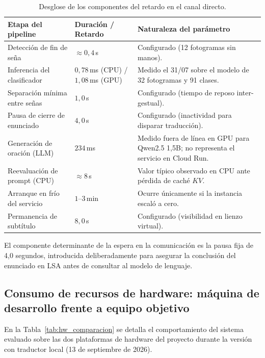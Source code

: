 \begin{table}[H]
    \centering
    \small
    \caption{Desglose de los componentes del retardo en el canal directo.}
    \label{tab:latencias_etapas}
    \begin{tabularx}{\textwidth}{@{}>{\raggedright\arraybackslash}p{} >{\raggedright\arraybackslash}p{} >{\raggedright\arraybackslash}X@{}}
        \toprule
        \textbf{Etapa del pipeline} & \textbf{Duración / Retardo} & \textbf{Naturaleza del parámetro} \\
        \midrule
        Detección de fin de seña & $\approx 0{,}4$\,s & Configurado (12 fotogramas sin manos). \\
        Inferencia del clasificador & $0{,}78$\,ms (CPU) / $1{,}08$\,ms (GPU) & Medido el 31/07 sobre el modelo de 32 fotogramas y 91 clases. \\
        Separación mínima entre señas & $1{,}0$\,s & Configurado (tiempo de reposo inter-gestual). \\
        Pausa de cierre de enunciado & $4{,}0$\,s & Configurado (inactividad para disparar traducción). \\
        Generación de oración (LLM) & $234$\,ms & Medido fuera de línea en GPU para Qwen2.5 1,5B; no representa el servicio en Cloud Run. \\
        Reevaluación de prompt (CPU) & $\approx 8$\,s & Valor típico observado en CPU ante pérdida de caché $KV$. \\
        Arranque en frío del servicio & $1$--$3$\,min & Ocurre únicamente si la instancia escaló a cero. \\
        Permanencia de subtítulo & $8{,}0$\,s & Configurado (visibilidad en lienzo virtual). \\
        \bottomrule
    \end{tabularx}
\end{table}

El componente determinante de la espera en la comunicación es la pausa fija de 4,0 segundos, introducida deliberadamente para asegurar la conclusión del enunciado en LSA antes de consultar al modelo de lenguaje.

\subsection{Consumo de recursos de hardware: máquina de desarrollo frente a equipo objetivo}
\label{sec:hardware_objetivo}
En la Tabla~\ref{tab:hw_comparacion} se detalla el comportamiento del sistema evaluado sobre las dos plataformas de hardware del proyecto durante la versión con traductor local (13 de septiembre de 2026).

